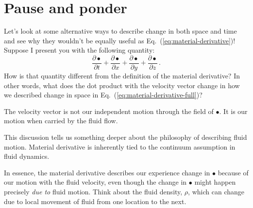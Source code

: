 \section{Pause and ponder}

Let's look at some alternative ways to describe change in both space and time and see why they wouldn't be equally useful as Eq.~(\ref{eq:material-derivative})! Suppose I present you with the following quantity:
\begin{equation} \label{eq:all-derivatives}
\frac{\partial \bullet}{\partial t} + \frac{\partial \bullet}{\partial x} + \frac{\partial \bullet}{\partial y} + \frac{\partial \bullet}{\partial z} \, .
\end{equation}
How is that quantity different from the definition of the material derivative? In other words, what does the dot product with the velocity vector change in how we described change in space in Eq.~(\ref{eq:material-derivative-full})?

The velocity vector is not our independent motion through the field of $\bullet$. It is our motion when carried by the fluid flow.


This discussion tells us something deeper about the philosophy of describing fluid motion. Material derivative is inherently tied to the continuum assumption in fluid dynamics.

In essence, the material derivative describes our experience change in $\bullet$ because of our motion with the fluid velocity, even though the change in $\bullet$ might happen precisely \textit{due to} fluid motion. Think about the fluid density, $\rho$, which can change due to local movement of fluid from one location to the next.




